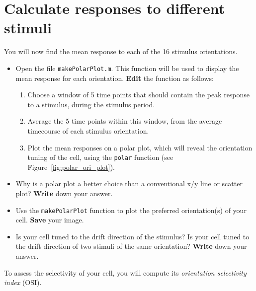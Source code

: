 \documentclass[paper=a4, fontsize=11pt]{article} %
\numberwithin{equation}{section} %
\numberwithin{figure}{section} %
\numberwithin{table}{section} %
\begin{document}
\section{Calculate responses to different stimuli}

You will now find the mean response to each of the 16 stimulus orientations.

\begin{itemize}
\item Open the file \texttt{makePolarPlot.m}. This function will be used to display the mean response for each orientation.
  \textbf{Edit} the function as follows:
  \begin{enumerate}
  \item Choose a window of 5 time points that should contain the peak response to a stimulus, during the stimulus period.
  \item Average the 5 time points within this window, from the average timecourse of each stimulus orientation.
  \item Plot the mean responses on a polar plot, which will reveal the orientation tuning of the cell, using the \texttt{polar} function (see Figure~\ref{fig:polar_ori_plot}).
  \end{enumerate}
\item Why is a polar plot a better choice than a conventional x/y line or scatter plot? \textbf{Write} down your answer.
  \vspace{1em}
\item Use the \texttt{makePolarPlot} function to plot the preferred orientation(s) of your cell. \textbf{Save} your image.
\item Is your cell tuned to the drift direction of the stimulus? Is your cell tuned to the drift direction of two stimuli of the same orientation?
  \textbf{Write} down your answer.
  \vspace{2em}
\end{itemize}

To assess the selectivity of your cell, you will compute its \emph{orientation selectivity index} (OSI).
\end{document}

